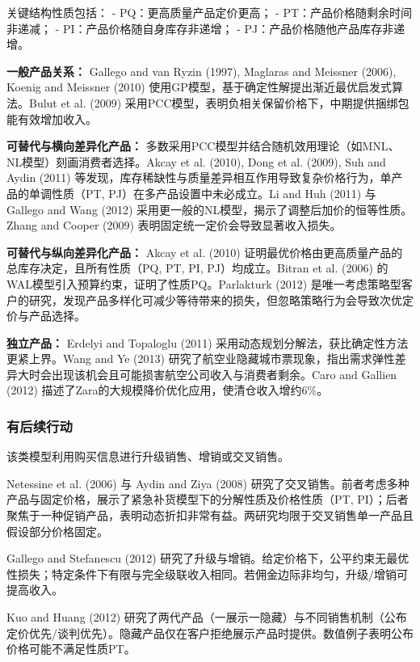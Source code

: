 关键结构性质包括：
- PQ：更高质量产品定价更高；
- PT：产品价格随剩余时间非递减；
- PI：产品价格随自身库存非递增；
- PJ：产品价格随他产品库存非递增。

\textbf{一般产品关系：} Gallego and van Ryzin (1997), Maglaras and Meissner (2006), Koenig and Meissner (2010) 使用GP模型，基于确定性解提出渐近最优启发式算法。Bulut et al. (2009) 采用PCC模型，表明负相关保留价格下，中期提供捆绑包能有效增加收入。

\textbf{可替代与横向差异化产品：} 多数采用PCC模型并结合随机效用理论（如MNL、NL模型）刻画消费者选择。Akcay et al. (2010), Dong et al. (2009), Suh and Aydin (2011) 等发现，库存稀缺性与质量差异相互作用导致复杂价格行为，单产品的单调性质（PT, PJ）在多产品设置中未必成立。Li and Huh (2011) 与 Gallego and Wang (2012) 采用更一般的NL模型，揭示了调整后加价的恒等性质。Zhang and Cooper (2009) 表明固定统一定价会导致显著收入损失。

\textbf{可替代与纵向差异化产品：} Akcay et al. (2010) 证明最优价格由更高质量产品的总库存决定，且所有性质（PQ, PT, PI, PJ）均成立。Bitran et al. (2006) 的WAL模型引入预算约束，证明了性质PQ。Parlakturk (2012) 是唯一考虑策略型客户的研究，发现产品多样化可减少等待带来的损失，但忽略策略行为会导致次优定价与产品选择。

\textbf{独立产品：} Erdelyi and Topaloglu (2011) 采用动态规划分解法，获比确定性方法更紧上界。Wang and Ye (2013) 研究了航空业隐藏城市票现象，指出需求弹性差异大时会出现该机会且可能损害航空公司收入与消费者剩余。Caro and Gallien (2012) 描述了Zara的大规模降价优化应用，使清仓收入增约6\%。

\subsubsection{有后续行动}\label{with-follow-up}

该类模型利用购买信息进行升级销售、增销或交叉销售。

Netessine et al. (2006) 与 Aydin and Ziya (2008) 研究了交叉销售。前者考虑多种产品与固定价格，展示了紧急补货模型下的分解性质及价格性质（PT, PI）；后者聚焦于一种促销产品，表明动态折扣非常有益。两研究均限于交叉销售单一产品且假设部分价格固定。

Gallego and Stefanescu (2012) 研究了升级与增销。给定价格下，公平约束无最优性损失；特定条件下有限与完全级联收入相同。若佣金边际非均匀，升级/增销可提高收入。

Kuo and Huang (2012) 研究了两代产品（一展示一隐藏）与不同销售机制（公布定价优先/谈判优先）。隐藏产品仅在客户拒绝展示产品时提供。数值例子表明公布价格可能不满足性质PT。

